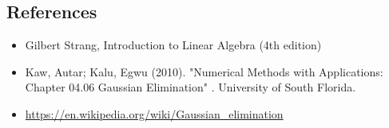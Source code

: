 \documentclass{article}
\begin{document}
\subsection*{References}

\begin{itemize}\itemsep .125cm
	\item Gilbert Strang, Introduction to Linear Algebra (4th edition)
	\item Kaw, Autar; Kalu, Egwu (2010). "Numerical Methods with Applications: Chapter 04.06 Gaussian Elimination" . University of South Florida.
	\item \url{https://en.wikipedia.org/wiki/Gaussian_elimination}
\end{itemize}

\ifx\onefile\undefined
	
\end{document}
